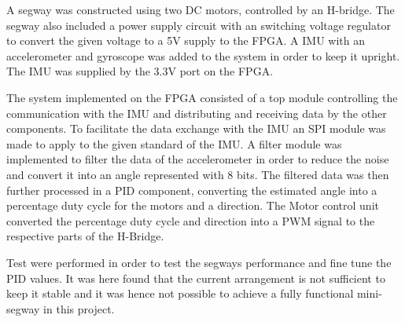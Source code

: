 A segway was constructed using two DC motors, controlled by an H-bridge.
The segway also included a power supply circuit with an switching voltage regulator to convert the given voltage to a 5V supply to the FPGA.
A IMU with an accelerometer and gyroscope was added to the system in order to keep it upright.
The IMU was supplied by the 3.3V port on the FPGA.

The system implemented on the FPGA consisted of a top module controlling the communication with the IMU and distributing and receiving data by the other components.
To facilitate the data exchange with the IMU an SPI module was made to apply to the given standard of the IMU.
A filter module was implemented to filter the data of the accelerometer in order to reduce the noise and convert it into an angle represented with 8 bits.
The filtered data was then further processed in a PID component, converting the estimated angle into a percentage duty cycle for the motors and a direction.
The Motor control unit converted the percentage duty cycle and direction into a PWM signal to the respective parts of the H-Bridge.

Test were performed in order to test the segways performance and fine tune the PID values.
It was here found that the current arrangement is not sufficient to keep it stable and it was hence not possible to achieve a fully functional mini-segway in this project.